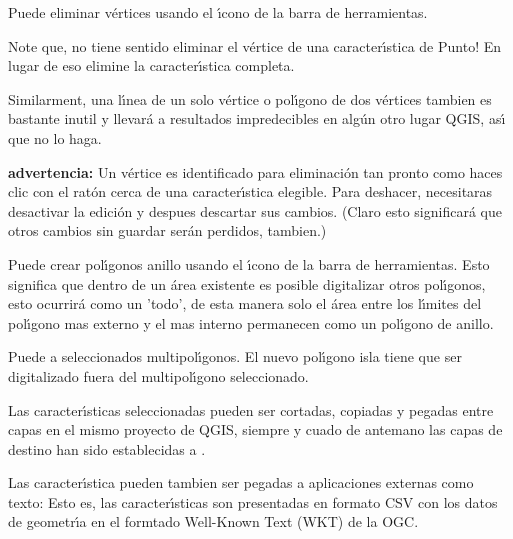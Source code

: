 Puede eliminar v\'ertices usando el \'{\i}cono 
de la barra de herramientas.

Note que, no tiene sentido eliminar el v\'ertice de una caracter\'{\i}stica de Punto!
En lugar de eso elimine la caracter\'{\i}stica completa.

Similarment, una l\'{\i}nea de un solo v\'ertice o pol\'{\i}gono de dos v\'ertices tambien es
bastante inutil y llevar\'a a resultados impredecibles en alg\'un otro lugar
QGIS, as\'{\i} que no lo haga.

\textbf{advertencia:} Un v\'ertice es identificado para eliminaci\'on tan pronto 
como haces clic con el rat\'on cerca de una caracter\'{\i}stica elegible.
Para deshacer, necesitaras desactivar
la edici\'on y despues descartar sus cambios.
(Claro esto significar\'a que otros cambios sin guardar ser\'an perdidos, tambien.)


Puede crear pol\'{\i}gonos anillo usando el \'{\i}cono 
de la barra de herramientas. Esto significa que dentro de un \'area existente es posible digitalizar
otros pol\'{\i}gonos, esto ocurrir\'a como un 'todo', de esta manera solo 
el \'area entre los l\'{\i}mites del pol\'{\i}gono mas externo y el mas interno permanecen 
como un pol\'{\i}gono de anillo. 


Puede  a seleccionados multipol\'{\i}gonos. 
El nuevo pol\'{\i}gono isla tiene que ser digitalizado fuera del multipol\'{\i}gono seleccionado. 


Las caracter\'{\i}sticas seleccionadas pueden ser cortadas, copiadas y pegadas entre capas en el mismo proyecto
de QGIS, siempre y cuado de antemano las capas de destino han sido establecidas a 
.

Las caracter\'{\i}stica pueden tambien ser pegadas a aplicaciones externas como texto:  Esto es,
las caracter\'{\i}sticas son presentadas en formato CSV con los datos de geometr\'{\i}a 
en el formtado Well-Known Text (WKT) de la OGC.


